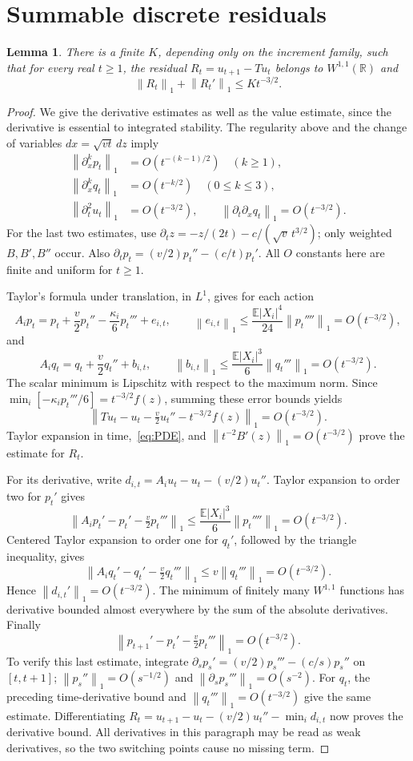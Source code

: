 \documentclass[11pt]{article}
\newtheorem{lemma}[theorem]{Lemma}
\newcommand{\E}{\mathbb E}
\newcommand{\R}{\mathbb R}
\newcommand{\norm}[1]{\left\|#1\right\|_1}
\begin{document}
\section{Summable discrete residuals}
\begin{lemma}\label{lem:res}
There is a finite $K$, depending only on the increment family, such that
for every real $t\ge1$, the residual $R_t=u_{t+1}-Tu_t$ belongs to
$W^{1,1}(\R)$ and
\begin{equation}\label{eq:res}
 \norm{R_t}+\norm{R_t'}\le Kt^{-3/2}.
\end{equation}
\end{lemma}
\begin{proof}
We give the derivative estimates as well as the value estimate, since
the derivative is essential to integrated stability. The regularity
above and the change of variables $dx=\sqrt{vt}\,dz$ imply
\begin{align*}
 \norm{\partial_x^k p_t}&=O(t^{-(k-1)/2})\quad(k\ge1),\\
 \norm{\partial_x^k q_t}&=O(t^{-k/2})\quad(0\le k\le3),\\
 \norm{\partial_t^2u_t}&=O(t^{-3/2}),\qquad
 \norm{\partial_t\partial_xq_t}=O(t^{-3/2}).
\end{align*}
For the last two estimates, use
$\partial_tz=-z/(2t)-c/(\sqrt v\,t^{3/2})$; only weighted
$B,B',B''$ occur. Also
$\partial_tp_t=(v/2)p_t''-(c/t)p_t'$.
All $O$ constants here are finite and uniform for $t\ge1$.

Taylor's formula under translation, in $L^1$, gives for each action
\[
 A_ip_t=p_t+\frac v2p_t''-\frac{\kappa_i}{6}p_t'''+e_{i,t},
 \qquad \norm{e_{i,t}}\le\frac{\E|X_i|^4}{24}\norm{p_t''''}
 =O(t^{-3/2}),
\]
and
\[
 A_iq_t=q_t+\frac v2q_t''+b_{i,t},\qquad
 \norm{b_{i,t}}\le\frac{\E|X_i|^3}{6}\norm{q_t'''}
 =O(t^{-3/2}).
\]
The scalar minimum is Lipschitz with respect to the maximum norm.
Since $\min_i[-\kappa_i p_t'''/6]=t^{-3/2}f(z)$, summing these
error bounds yields
\[
 \norm{Tu_t-u_t-\tfrac v2u_t''-t^{-3/2}f(z)}=O(t^{-3/2}).
\]
Taylor expansion in time,~\eqref{eq:PDE}, and
$\norm{t^{-2}B'(z)}=O(t^{-3/2})$ prove the estimate for $R_t$.

For its derivative, write
$d_{i,t}=A_i u_t-u_t-(v/2)u_t''$.
Taylor expansion to order two for $p_t'$ gives
\[
 \norm{A_ip_t'-p_t'-\tfrac v2p_t'''}
 \le\frac{\E|X_i|^3}{6}\norm{p_t''''}=O(t^{-3/2}).
\]
Centered Taylor expansion to order one for $q_t'$, followed by
the triangle inequality, gives
\[
 \norm{A_iq_t'-q_t'-\tfrac v2q_t'''}
 \le v\norm{q_t'''}=O(t^{-3/2}).
\]
Hence $\norm{d_{i,t}'}=O(t^{-3/2})$.
The minimum of finitely many $W^{1,1}$ functions has derivative
bounded almost everywhere by the sum of the absolute derivatives.
Finally
\[
 \norm{p_{t+1}'-p_t'-\tfrac v2p_t'''}=O(t^{-3/2}).
\]
To verify this last estimate, integrate
$\partial_s p_s'=(v/2)p_s'''-(c/s)p_s''$ on $[t,t+1]$;
$\norm{p_s''}=O(s^{-1/2})$ and
$\norm{\partial_s p_s'''}=O(s^{-2})$.
For $q_t$, the preceding time-derivative bound and
$\norm{q_t'''}=O(t^{-3/2})$ give the same estimate.
Differentiating
$R_t=u_{t+1}-u_t-(v/2)u_t''-\min_i d_{i,t}$ now proves
the derivative bound. All derivatives in this paragraph may be read
as weak derivatives, so the two switching points cause no missing term.
\end{proof}
\end{document}
